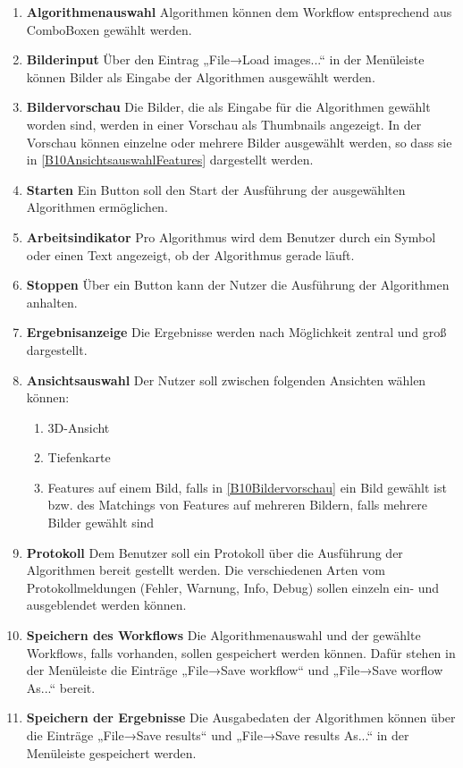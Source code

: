 \begin{enumerate}[ align=left, label={\textbf{\textbackslash B10\arabic*0\textbackslash}} ]
	\item \textbf{Algorithmenauswahl} Algorithmen können dem Workflow entsprechend aus ComboBoxen gewählt werden.
	\item \textbf{Bilderinput} Über den Eintrag „File→Load images...“ in der Menüleiste können Bilder als Eingabe der Algorithmen ausgewählt werden.
	\item \textbf{Bildervorschau} \label{B10Bildervorschau} Die Bilder, die als Eingabe für die Algorithmen gewählt worden sind, werden in einer Vorschau als Thumbnails angezeigt. In der Vorschau können einzelne oder mehrere Bilder ausgewählt werden, so dass sie in \ref{B10AnsichtsauswahlFeatures} dargestellt werden.
	\item \textbf{Starten} \label{B10Starten} Ein Button soll den Start der Ausführung der ausgewählten Algorithmen ermöglichen.
	\item \textbf{Arbeitsindikator} Pro Algorithmus wird dem Benutzer durch ein Symbol oder einen Text angezeigt, ob der Algorithmus gerade läuft.
	\item \textbf{Stoppen} Über ein Button kann der Nutzer die Ausführung der Algorithmen anhalten.
	\item \textbf{Ergebnisanzeige} Die Ergebnisse werden nach Möglichkeit zentral und groß dargestellt.
	\item \textbf{Ansichtsauswahl} Der Nutzer soll zwischen folgenden Ansichten wählen können:
		\begin{enumerate}[ label={\textbf{\alph*}}, ref={\textbf{\textbackslash B10\arabic{enumi}0\textbackslash\alph*}} ]
			\item 3D-Ansicht
			\item Tiefenkarte
			\item \label{B10AnsichtsauswahlFeatures} Features auf einem Bild, falls in \ref{B10Bildervorschau} ein Bild gewählt ist bzw. des Matchings von Features auf mehreren Bildern, falls mehrere Bilder gewählt sind
		\end{enumerate}
	\item \textbf{Protokoll} Dem Benutzer soll ein Protokoll über die Ausführung der Algorithmen bereit gestellt werden. Die verschiedenen Arten vom Protokollmeldungen (Fehler, Warnung, Info, Debug) sollen einzeln ein- und ausgeblendet werden können.
	\item \textbf{Speichern des Workflows} Die Algorithmenauswahl und der gewählte Workflows, falls vorhanden, sollen gespeichert werden können. Dafür stehen in der Menüleiste die Einträge „File→Save workflow“ und „File→Save worflow As...“ bereit.
	\item \textbf{Speichern der Ergebnisse} Die Ausgabedaten der Algorithmen können über die Einträge „File→Save results“ und „File→Save results As...“ in der Menüleiste gespeichert werden.
\end{enumerate}

